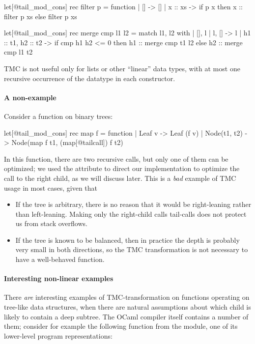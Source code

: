 \begin{minipage}{0.47\linewidth}
\begin{Ocaml}
let[@tail_mod_cons] rec filter p =
  function
  | [] -> []
  | x :: xs ->
    if p x
    then x :: filter p xs
    else filter p xs
\end{Ocaml}
\end{minipage}
\hfill
\begin{minipage}{0.53\linewidth}
\begin{Ocaml}
let[@tail_mod_cons] rec merge cmp l1 l2 =
  match l1, l2 with
  | [], l | l, [] -> l
  | h1 :: t1, h2 :: t2 ->
      if cmp h1 h2 <= 0
      then h1 :: merge cmp t1 l2
      else h2 :: merge cmp l1 t2
\end{Ocaml}
\end{minipage}

TMC is not useful only for lists or other ``linear'' data types, with
at most one recursive occurrence of the datatype in each
constructor.

\paragraph{A non-example} Consider a  function on binary
trees:
\begin{Ocaml}
let[@tail_mod_cons] rec map f = function
| Leaf v -> Leaf (f v)
| Node(t1, t2) -> Node(map f t1, (map[@tailcall]) f t2)
\end{Ocaml}
In this function, there are two recursive calls, but only one of them
can be optimized; we used the \ocaml{[@tailcall]} attribute to direct
our implementation to optimize the call to the right child, as we will
discuss later. This is a \emph{bad} example of TMC usage in most
cases, given that
\begin{itemize}
\item If the tree is arbitrary, there is no reason that it would be
  right-leaning rather than left-leaning. Making only the right-child
  calls tail-calls does not protect us from stack overflows.
\item If the tree is known to be balanced, then in practice the depth
  is probably very small in both directions, so the TMC transformation
  is not necessary to have a well-behaved function.
\end{itemize}

\paragraph{Interesting non-linear examples} There \emph{are} interesting
examples of TMC-transformation on functions operating on tree-like
data structures, when there are natural assumptions about which child
is likely to contain a deep subtree. The OCaml compiler itself
contains a number of them; consider for example the following function
from the  module, one of its lower-level program
representations:

